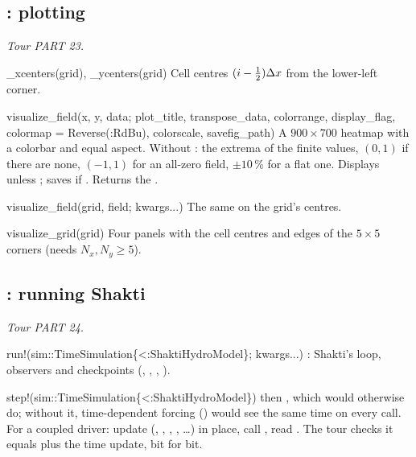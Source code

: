 \subsection{: plotting}\label{ref:makieext}
\emph{Tour PART 23.}
\begin{fnlist}
\item[\_xcenters(grid), \_ycenters(grid)] Cell centres $(i - \tfrac12)\Delta x$ from the lower-left corner.
\item[visualize\_field(x, y, data; plot\_title, transpose\_data, colorrange, display\_flag, colormap = Reverse(:RdBu), colorscale, savefig\_path)]
  A $900\times700$ heatmap with a colorbar and equal aspect. Without : the extrema of the finite values, $(0, 1)$ if
  there are none, $(-1, 1)$ for an all-zero field, $\pm10\,\%$ for a flat one. Displays unless ; saves if
  . Returns the .
\item[visualize\_field(grid, field; kwargs...)] The same on the grid's centres.
\item[visualize\_grid(grid)] Four panels with the cell centres and edges of the $5\times5$ corners (needs $N_x, N_y\ge5$).
\end{fnlist}

\subsection{: running Shakti}\label{ref:shaktiext}
\emph{Tour PART 24.}
\begin{fnlist}
\item[run!(sim::TimeSimulation\{<:ShaktiHydroModel\}; kwargs...)] : Shakti's loop, observers
  and checkpoints (, , , ).
\item[step!(sim::TimeSimulation\{<:ShaktiHydroModel\})]  then , which
   would otherwise do; without it, time-dependent forcing () would see the same time on every
  call. For a coupled driver: update  (, , , , \ldots) in place, call
  , read . The tour checks it equals  plus the time update, bit for bit.
\end{fnlist}
